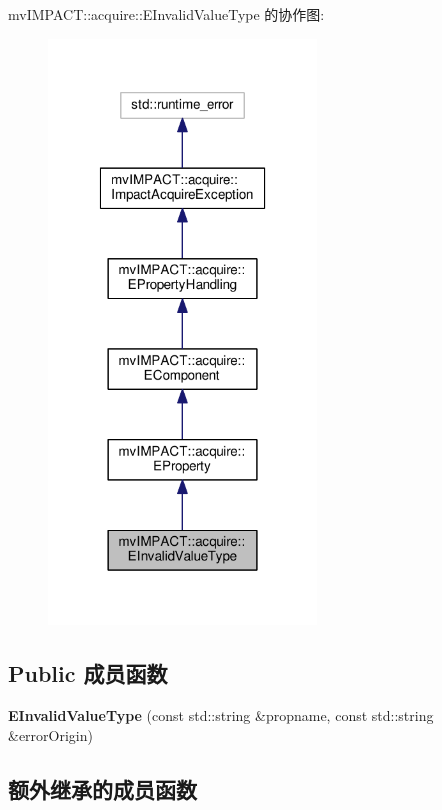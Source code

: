 mv\+I\+M\+P\+A\+C\+T\+:\+:acquire\+:\+:E\+Invalid\+Value\+Type 的协作图\+:
\nopagebreak
\begin{figure}[H]
\begin{center}
\leavevmode
\includegraphics[width=202pt]{classmv_i_m_p_a_c_t_1_1acquire_1_1_e_invalid_value_type__coll__graph}
\end{center}
\end{figure}
\subsection*{Public 成员函数}
\begin{DoxyCompactItemize}
\item 
\hypertarget{classmv_i_m_p_a_c_t_1_1acquire_1_1_e_invalid_value_type_ad420f6a6efa1244ced2cee4141c3a573}{{\bfseries E\+Invalid\+Value\+Type} (const std\+::string \&propname, const std\+::string \&error\+Origin)}\label{classmv_i_m_p_a_c_t_1_1acquire_1_1_e_invalid_value_type_ad420f6a6efa1244ced2cee4141c3a573}

\end{DoxyCompactItemize}
\subsection*{额外继承的成员函数}


